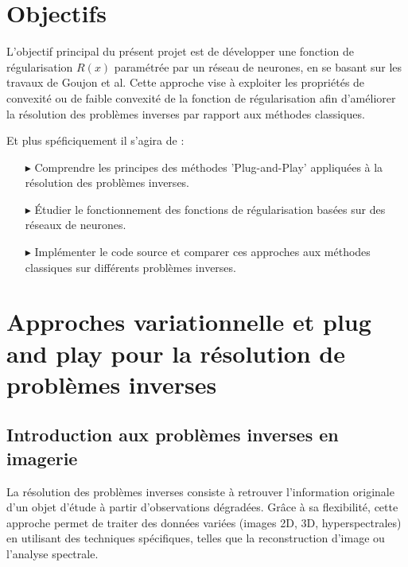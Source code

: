 \documentclass[a4paper, 12pt]{report} %
\begin{document}
\setcounter{tocdepth}{1} 

\tableofcontents 

\newpage


\chapter*{Objectifs }
L'objectif principal du présent projet est de développer une fonction de régularisation \( R(x) \) paramétrée par un réseau de neurones, en se basant sur les travaux de Goujon et al. Cette approche vise à exploiter les propriétés de convexité ou de faible convexité de la fonction de régularisation afin d'améliorer la résolution des problèmes inverses par rapport aux méthodes classiques.

Et plus spéficiquement il s'agira de :
\begin{itemize}
    \item [$\blacktriangleright$] Comprendre les principes des méthodes 'Plug-and-Play' appliquées à la résolution des problèmes inverses.
    \item [$\blacktriangleright$] Étudier le fonctionnement des fonctions de régularisation basées sur des réseaux de neurones.
    \item [$\blacktriangleright$] Implémenter le code source et comparer ces approches aux méthodes classiques sur différents problèmes inverses.
\end{itemize} 

\newpage


\chapter{Approches variationnelle et plug and play pour la résolution de problèmes inverses}


\section{Introduction aux  problèmes inverses en imagerie}
 
La résolution des problèmes inverses consiste à retrouver l'information originale d'un objet d'étude à partir d'observations dégradées. Grâce à sa flexibilité, cette approche permet de traiter des données variées (images 2D, 3D, hyperspectrales) en utilisant des techniques spécifiques, telles que la reconstruction d'image ou l'analyse spectrale.
\end{document}
